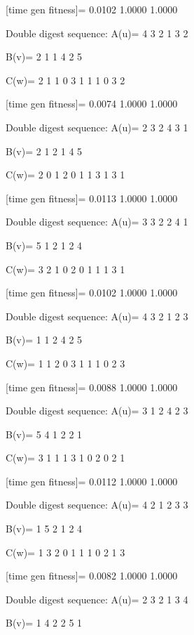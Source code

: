 [time gen fitness]=
    0.0102    1.0000    1.0000

Double digest sequence:
A(u)=
     4     3     2     1     3     2

B(v)=
     2     1     1     4     2     5

C(w)=
     2     1     1     0     3     1     1     1     0     3     2

[time gen fitness]=
    0.0074    1.0000    1.0000

Double digest sequence:
A(u)=
     2     3     2     4     3     1

B(v)=
     2     1     2     1     4     5

C(w)=
     2     0     1     2     0     1     1     3     1     3     1

[time gen fitness]=
    0.0113    1.0000    1.0000

Double digest sequence:
A(u)=
     3     3     2     2     4     1

B(v)=
     5     1     2     1     2     4

C(w)=
     3     2     1     0     2     0     1     1     1     3     1

[time gen fitness]=
    0.0102    1.0000    1.0000

Double digest sequence:
A(u)=
     4     3     2     1     2     3

B(v)=
     1     1     2     4     2     5

C(w)=
     1     1     2     0     3     1     1     1     0     2     3

[time gen fitness]=
    0.0088    1.0000    1.0000

Double digest sequence:
A(u)=
     3     1     2     4     2     3

B(v)=
     5     4     1     2     2     1

C(w)=
     3     1     1     1     3     1     0     2     0     2     1

[time gen fitness]=
    0.0112    1.0000    1.0000

Double digest sequence:
A(u)=
     4     2     1     2     3     3

B(v)=
     1     5     2     1     2     4

C(w)=
     1     3     2     0     1     1     1     0     2     1     3

[time gen fitness]=
    0.0082    1.0000    1.0000

Double digest sequence:
A(u)=
     2     3     2     1     3     4

B(v)=
     1     4     2     2     5     1

